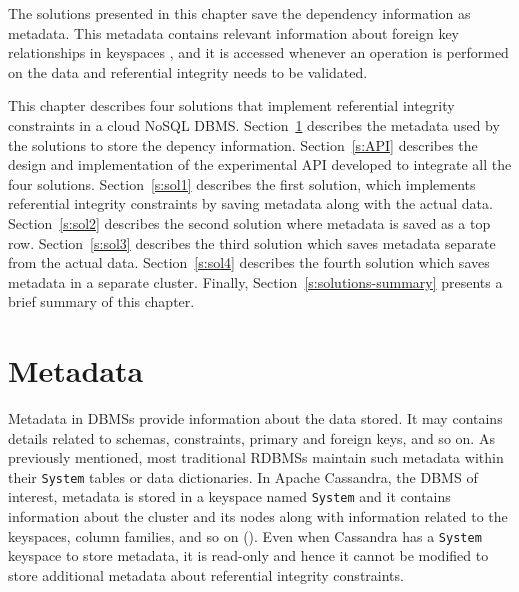 The solutions presented in this chapter save the dependency information as
metadata. This metadata contains relevant  information about  foreign
key relationships in keyspaces , and it is
accessed whenever an operation is performed on the data and referential
integrity needs to be validated. 


This chapter describes  four  solutions  that implement referential
integrity constraints in a cloud \ac{NoSQL} \ac{DBMS}.
Section~\ref{s:Metadata} describes the metadata used by the solutions 
 to store the depency information.
Section~\ref{s:API} describes the design and implementation of the experimental
API developed to integrate all the four
solutions. 
Section~\ref{s:sol1} describes  the first solution, which implements
referential integrity constraints by saving metadata along with the actual data.
Section~\ref{s:sol2} describes the second  solution where metadata is
saved as a top row. Section~\ref{s:sol3} describes the third   
solution which saves metadata separate from the actual data.   
Section~\ref{s:sol4}  describes the fourth solution which saves metadata in a separate cluster.
Finally, Section~\ref{s:solutions-summary} presents a brief summary of this
chapter. 

\section{Metadata}\label{s:Metadata}
Metadata in \acp{DBMS} provide information about the data stored. It may
contains details related to schemas, constraints,  primary and foreign keys, and
so on.   As previously mentioned,  most traditional \acp{RDBMS} maintain such
metadata within their \texttt{System}  tables or data dictionaries.  
In Apache Cassandra, the \ac{DBMS} of interest, metadata is stored in a 
keyspace named \texttt{System} and it contains information
about the cluster and its nodes along with information related to the
keyspaces, column families, and so on ().
 Even when Cassandra has a  \texttt{System} keyspace to store metadata, it 
 is read-only and hence it cannot be modified to store additional metadata
 about referential integrity constraints. 
 

